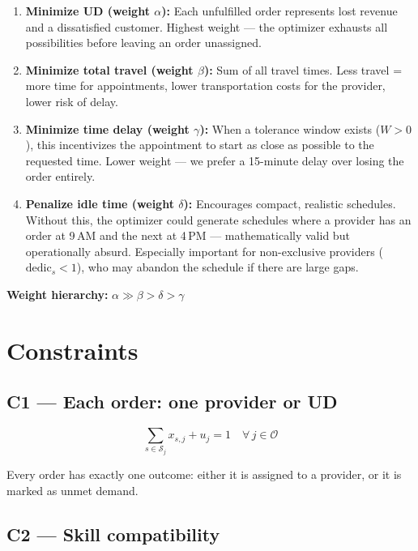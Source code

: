 \documentclass[11pt,a4paper]{article}
\begin{document}
\begin{enumerate}[leftmargin=*]
\item \textbf{Minimize UD (weight $\alpha$):} Each unfulfilled order represents lost revenue and a dissatisfied customer. Highest weight --- the optimizer exhausts all possibilities before leaving an order unassigned.

\item \textbf{Minimize total travel (weight $\beta$):} Sum of all travel times. Less travel = more time for appointments, lower transportation costs for the provider, lower risk of delay.

\item \textbf{Minimize time delay (weight $\gamma$):} When a tolerance window exists ($W > 0$), this incentivizes the appointment to start as close as possible to the requested time. Lower weight --- we prefer a 15-minute delay over losing the order entirely.

\item \textbf{Penalize idle time (weight $\delta$):} Encourages compact, realistic schedules. Without this, the optimizer could generate schedules where a provider has an order at 9\,AM and the next at 4\,PM --- mathematically valid but operationally absurd. Especially important for non-exclusive providers ($\text{dedic}_s < 1$), who may abandon the schedule if there are large gaps.
\end{enumerate}

\textbf{Weight hierarchy:} $\alpha \gg \beta > \delta > \gamma$

\section{Constraints}

\subsection{C1 --- Each order: one provider or UD}

\begin{equation}
\sum_{s \in \mathcal{S}_j} x_{s,j} + u_j = 1 \quad \forall\, j \in \mathcal{O}
\end{equation}

Every order has exactly one outcome: either it is assigned to a provider, or it is marked as unmet demand.

\subsection{C2 --- Skill compatibility}
\end{document}
